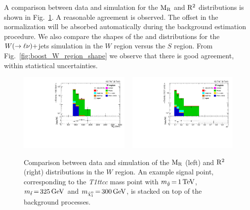 A comparison between data and simulation for the $\mathrm{M_R}$ and $\mathrm{R^2}$ distributions is shown in
Fig.~\ref{fig:boost_W_region_MR_Rsq}. A reasonable agreement is observed. The offset in the
normalization will be absorbed automatically during the background estimation procedure. 
We also compare the shapes of the \mr and \rsq distributions for the $W(\rightarrow\ell\nu)+$jets
simulation in the $W$ region versus the $S$ region. From Fig.~\ref{fig:boost_W_region_shape} we
observe that there is good agreement, within statistical uncertainties. 
 
\begin{figure}[htbp]
\centering
\includegraphics[width=0.48\textwidth]
{figures/razor_selection/plots/DataMC_MR_0Lbg1Y1LlmT_mdPhig0p5_width}
~
\includegraphics[width=0.48\textwidth]
{figures/razor_selection/plots/DataMC_R2_0Lbg1Y1LlmT_mdPhig0p5_width}
\caption{Comparison between data and simulation of the $\mathrm{M_R}$ (left) and $\mathrm{R^2}$ (right)
distributions in the $W$ region. An example signal
point, corresponding to the {\it T1ttcc} mass point with $m_{\tilde{g}} \,{=}\, 1\,\text{Te\hspace{-.08em}V}$,
$m_{\tilde{t}} \,{=}\, 325\,\text{Ge\hspace{-.08em}V}$ and $m_{\tilde{\chi}_1^0} \,{=}\, 300\,\text{Ge\hspace{-.08em}V}$, is stacked on top of
the
background processes.
\label{fig:boost_W_region_MR_Rsq}}
\end{figure}

